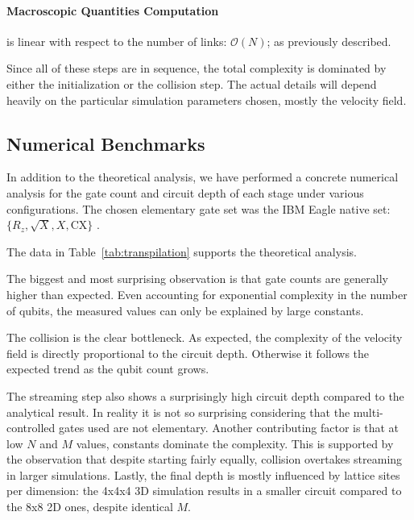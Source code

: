 \paragraph*{Macroscopic Quantities Computation} is linear with respect to the number of links: $\mathcal{O}(N)$; as previously described.

Since all of these steps are in sequence, the total complexity is dominated by either the initialization or the collision step.
The actual details will depend heavily on the particular simulation parameters chosen, mostly the velocity field.

\subsection{Numerical Benchmarks}

In addition to the theoretical analysis, we have performed a concrete numerical analysis for the gate count and circuit depth of each stage under various configurations.
The chosen elementary gate set was the IBM Eagle native set: $\{R_z, \sqrt{X}, X, \text{CX}\}$ \cite{ibm_quantum_2026}.

The data in Table~\ref{tab:transpilation} supports the theoretical analysis.

The biggest and most surprising observation is that gate counts are generally higher than expected.
Even accounting for exponential complexity in the number of qubits, the measured values can only be explained by large constants.   

The collision is the clear bottleneck. 
As expected, the complexity of the velocity field is directly proportional to the circuit depth.
Otherwise it follows the expected trend as the qubit count grows.

The streaming step also shows a surprisingly high circuit depth compared to the analytical result.
In reality it is not so surprising considering that the multi-controlled gates used are not elementary.
Another contributing factor is that at low $N$ and $M$ values, constants dominate the complexity.
This is supported by the observation that despite starting fairly equally, collision overtakes streaming in larger simulations.
Lastly, the final depth is mostly influenced by lattice sites per dimension: the 4x4x4 3D simulation results in a smaller circuit compared to the 8x8 2D ones, despite identical $M$.

